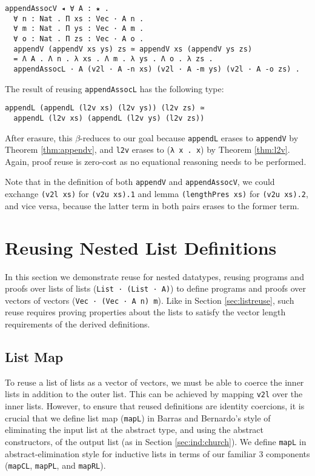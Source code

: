 \documentclass[a4paper,envcountsame,envcountsect]{llncs}
\newcommand{\refsec}[1]{Section \ref{sec:#1}}
\newcommand{\labsec}[1]{\label{sec:#1}}
\newcommand{\refthm}[1]{Theorem \ref{thm:#1}}
\begin{document}
\begin{verbatim}
appendAssocV ◂ ∀ A : ★ .
  ∀ n : Nat . Π xs : Vec · A n .
  ∀ m : Nat . Π ys : Vec · A m .
  ∀ o : Nat . Π zs : Vec · A o .
  appendV (appendV xs ys) zs ≃ appendV xs (appendV ys zs)
  = Λ A . Λ n . λ xs . Λ m . λ ys . Λ o . λ zs .
  appendAssocL · A (v2l · A -n xs) (v2l · A -m ys) (v2l · A -o zs) .
\end{verbatim}

The result of reusing \texttt{appendAssocL} has the following type:
\begin{verbatim}
appendL (appendL (l2v xs) (l2v ys)) (l2v zs) ≃ 
  appendL (l2v xs) (appendL (l2v ys) (l2v zs))
\end{verbatim}

After erasure, this $\beta$-reduces to our goal because
\texttt{appendL} erases to \texttt{appendV} by
\refthm{appendv}, and \texttt{l2v} erases to (\texttt{λ x . x})
by \refthm{l2v}. Again, proof reuse is zero-cost as no equational
reasoning needs to be performed.

\begin{remark}
Note that in the definition of both \texttt{appendV} and
\texttt{appendAssocV}, we could exchange \texttt{(v2l xs)} for
\texttt{(v2u xs).1} and lemma \texttt{(lengthPres xs)} for
\texttt{(v2u xs).2}, and vice versa, because the latter term in both pairs
erases to the former term.
\end{remark}

\section{Reusing Nested List Definitions}
\labsec{nestreuse}

In this section we demonstrate reuse for nested datatypes,
reusing programs and proofs over lists of lists
(\texttt{List · (List · A)}) to define programs and proofs
over vectors of vectors (\texttt{Vec · (Vec · A n) m}).
Like in \refsec{listreuse}, such reuse requires proving properties
about the lists to satisfy the vector length requirements of
the derived definitions.

\subsection{List Map}
\labsec{nestreuse:mapl}

To reuse a list of lists as a vector of vectors, we must be able to
coerce the inner lists in addition to the outer list. This can be
achieved by mapping \texttt{v2l} over the inner lists. However, to
ensure that reused definitions are identity coercions, it is crucial
that we define list map (\texttt{mapL}) in Barras and Bernardo's style
of eliminating the input list at the abstract type, and using the
abstract constructors, of the output list
(as in \refsec{ind:church}). We define \texttt{mapL} in
abstract-elimination style for inductive lists in terms of our
familiar 3 components (\texttt{mapCL}, \texttt{mapPL}, and
\texttt{mapRL}).
\end{document}

